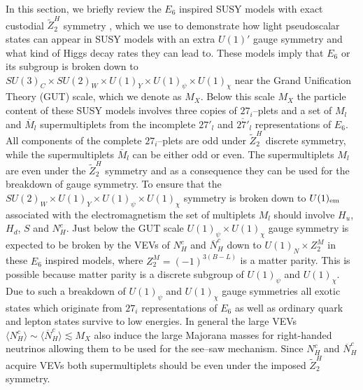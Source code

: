 \documentclass[12pt,a4paper]{article}
\begin{document}
In this section, we briefly review the $E_6$ inspired SUSY models with
exact custodial $\tilde{Z}^{H}_2$ symmetry \cite{nevzorov}, which we
use to demonstrate how light pseudoscalar states can appear in SUSY
models with an extra $U(1)'$ gauge symmetry and what kind of Higgs
decay rates they can lead to.  These models imply that $E_6$ or its
subgroup is broken down to $SU(3)_C\times SU(2)_W\times U(1)_Y\times
U(1)_{\psi}\times U(1)_{\chi}$ near the Grand Unification Theory (GUT)
scale, which we denote as $M_X$. Below this scale $M_X$ the particle content 
of these SUSY
models involves three copies of $27_i$--plets and a set of $M_{l}$ and
$\overline{M}_l$ supermultiplets from the incomplete $27'_l$ and
$\overline{27'}_l$ representations of $E_6$. All components of the
complete $27_i$--plets are odd under $\tilde{Z}^{H}_2$ discrete
symmetry, while the supermultiplets $\overline{M}_l$ can be either odd
or even. The supermultiplets $M_{l}$ are even under the
$\tilde{Z}^{H}_2$ symmetry and as a consequence they can be used for
the breakdown of gauge symmetry. To ensure that the $SU(2)_W\times
U(1)_Y\times U(1)_{\psi}\times U(1)_{\chi}$ symmetry is broken down to
$U(1)_{\rm em}$ associated with the electromagnetism the set of multiplets
$M_{l}$ should involve $H_u$, $H_d$, $S$ and $N^c_H$.  Just below the
GUT scale $U(1)_{\psi}\times U(1)_{\chi}$ gauge symmetry is expected
to be broken by the VEVs of $N^c_H$ and $\overline{N}_H^c$ down to
$U(1)_{N}\times Z_{2}^{M}$ in these $E_6$ inspired models, where
$Z_{2}^{M}=(-1)^{3(B-L)}$ is a matter parity. This is possible because
matter parity is a discrete subgroup of $U(1)_{\psi}$ and
$U(1)_{\chi}$. Due to such a breakdown of $U(1)_{\psi}$ and
$U(1)_{\chi}$ gauge symmetries all exotic states which originate from
$27_i$ representations of $E_6$ as well as ordinary quark and lepton
states survive to low energies. In general the large VEVs $\langle
N^c_H \rangle \sim \langle \overline{N}_H^c \rangle \lesssim M_X$ also
induce the large Majorana masses for right-handed neutrinos allowing
them to be used for the see--saw mechanism.  Since $N^c_H$ and
$\overline{N}_H^c$ acquire VEVs both supermultiplets should be even
under the imposed $\tilde{Z}^{H}_2$ symmetry.
\end{document}
